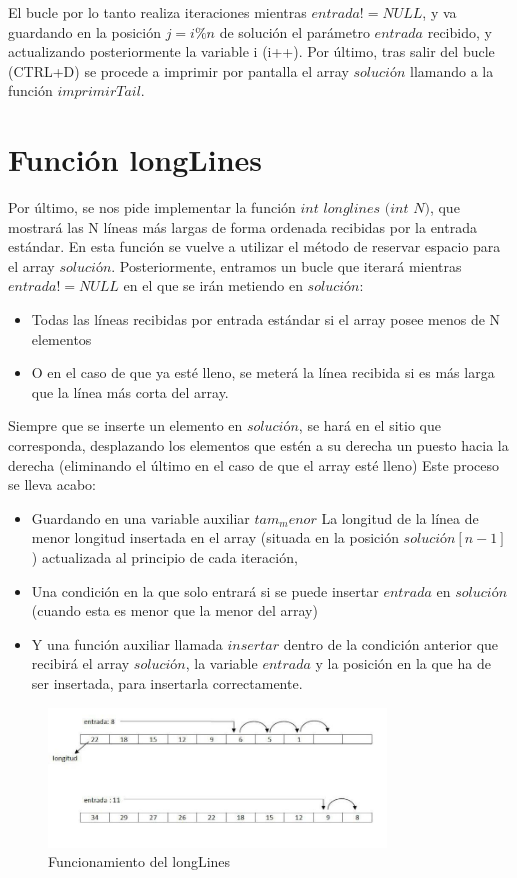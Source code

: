 El bucle por lo tanto realiza iteraciones mientras $entrada != NULL$, y va guardando en la posición $j=i\%n$ de solución el parámetro $entrada$ recibido, y actualizando posteriormente la variable i (i++).
Por último, tras salir del bucle (CTRL+D) se procede a imprimir por pantalla el array $solución$ llamando a la función $imprimirTail$.
\section{Función longLines}
Por último, se nos pide implementar la función $int$ $longlines$ $(int$ $N)$, que mostrará las N líneas más largas de forma ordenada recibidas por la entrada estándar.
En esta función se vuelve a utilizar el método de reservar espacio para el array $solución$. Posteriormente, entramos un bucle que iterará mientras $entrada != NULL$ en el que se irán metiendo en $solución$:
\begin{itemize}
\item Todas las líneas recibidas por entrada estándar si el array posee menos de N elementos
\item O en el caso de que ya esté lleno, se meterá la línea recibida si es más larga que la línea más corta del array.
\end{itemize}
Siempre que se inserte un elemento en $solución$, se hará en el sitio que corresponda, desplazando los elementos que estén a su derecha un puesto hacia la derecha (eliminando el último en el caso de que el array esté lleno)
Este proceso se lleva acabo:
\begin{itemize}
\item Guardando en una variable auxiliar $tam_menor$ La longitud de la línea de menor longitud insertada en el array (situada en la posición $solución[n-1]$) actualizada al principio de cada iteración,
\item Una condición en la que solo entrará si se puede insertar $entrada$ en $solución$ (cuando esta es menor que la menor del array)
\item Y una función auxiliar llamada $insertar$ dentro de la condición anterior que recibirá el array $solución$, la variable $entrada$ y la posición en la que ha de ser insertada, para insertarla correctamente.
\end{itemize}
\begin{figure}[htb]
\begin{center}
\centering
  \includegraphics[width=0.8\textwidth]{./img_2}
  \caption{Funcionamiento del longLines}
  \label{fig:Funcionamiento del longLines}
\end{center}
\end{figure} 

